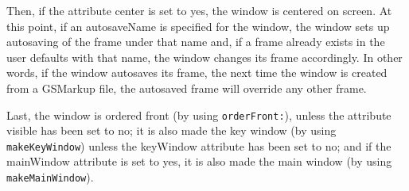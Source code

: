 Then, if the attribute center is set to yes, the window is centered on
screen.  At this point, if an autosaveName is specified for the
window, the window sets up autosaving of the frame under that name
and, if a frame already exists in the user defaults with that name,
the window changes its frame accordingly.  In other words, if the
window autosaves its frame, the next time the window is created from a
GSMarkup file, the autosaved frame will override any other frame.

Last, the window is ordered front (by using \texttt{orderFront:}),
unless the attribute visible has been set to no; it is also made the
key window (by using \texttt{makeKeyWindow}) unless the keyWindow
attribute has been set to no; and if the mainWindow attribute is set
to yes, it is also made the main window (by using
\texttt{makeMainWindow}).

